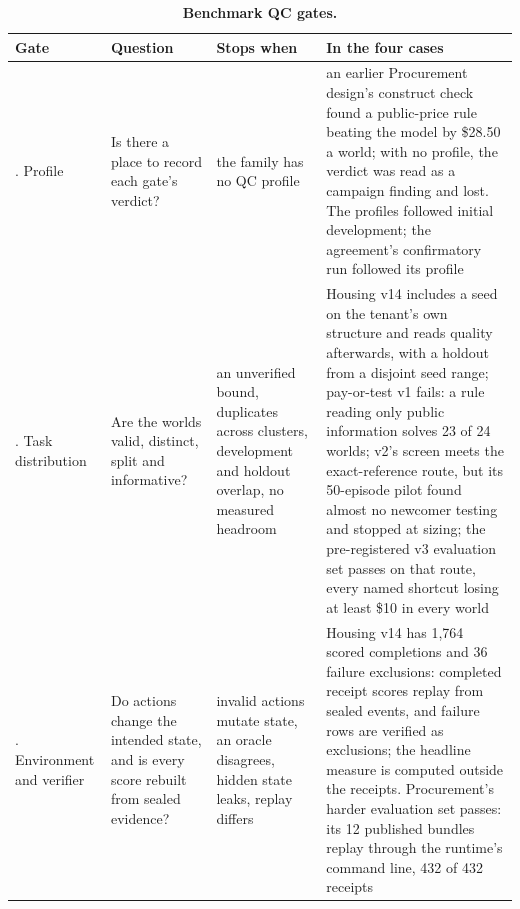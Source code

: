 \renewcommand{\thetable}{F.1}
\begin{longtable}[]{@{}
  >{\raggedright\arraybackslash}p{}
  >{\raggedright\arraybackslash}p{}
  >{\raggedright\arraybackslash}p{}
  >{\raggedright\arraybackslash}p{}@{}}
\caption{\textbf{Benchmark QC gates.}}\label{tab:F.1}\tabularnewline
\toprule\noalign{}
\begin{minipage}[b]{\linewidth}\raggedright
Gate
\end{minipage} & \begin{minipage}[b]{\linewidth}\raggedright
Question
\end{minipage} & \begin{minipage}[b]{\linewidth}\raggedright
Stops when
\end{minipage} & \begin{minipage}[b]{\linewidth}\raggedright
In the four cases
\end{minipage} \\
\midrule\noalign{}
\endhead
\bottomrule\noalign{}
\endlastfoot
0. Profile & Is there a place to record each gate's verdict? & the family has no QC profile & an earlier Procurement design's construct check found a public-price rule beating the model by \$28.50 a world; with no profile, the verdict was read as a campaign finding and lost. The profiles followed initial development; the agreement's confirmatory run followed its profile \\
1. Task distribution & Are the worlds valid, distinct, split and informative? & an unverified bound, duplicates across clusters, development and holdout overlap, no measured headroom & Housing v14 includes a seed on the tenant's own structure and reads quality afterwards, with a holdout from a disjoint seed range; pay-or-test v1 fails: a rule reading only public information solves 23 of 24 worlds; v2's screen meets the exact-reference route, but its 50-episode pilot found almost no newcomer testing and stopped at sizing; the pre-registered v3 evaluation set passes on that route, every named shortcut losing at least \$10 in every world \\
2. Environment and verifier & Do actions change the intended state, and is every score rebuilt from sealed evidence? & invalid actions mutate state, an oracle disagrees, hidden state leaks, replay differs & Housing v14 has 1,764 scored completions and 36 failure exclusions: completed receipt scores replay from sealed events, and failure rows are verified as exclusions; the headline measure is computed outside the receipts. Procurement's harder evaluation set passes: its 12 published bundles replay through the runtime's command line, 432 of 432 receipts \\

\end{longtable}
